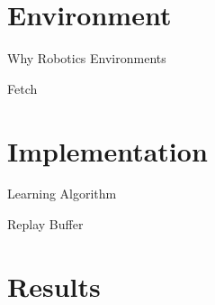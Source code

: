 \documentclass{beamer}
\begin{document}
\section{Environment}

      \begin{frame}{Why Robotics Environments}
            
      \end{frame}

      \begin{frame}{Fetch}

      \end{frame}

\section{Implementation}

      \begin{frame}{Learning Algorithm}
                  
      \end{frame}

      \begin{frame}{Replay Buffer}
                  
      \end{frame}


\section{Results}

\backmatter
\end{document}
